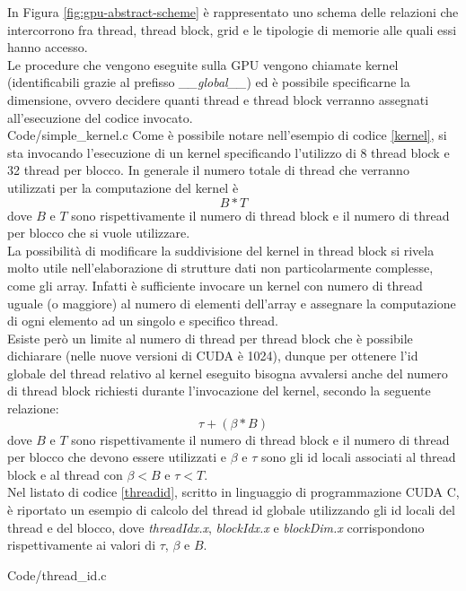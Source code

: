 In Figura \ref{fig:gpu-abstract-scheme} è rappresentato uno schema delle
relazioni che intercorrono fra thread, thread block, grid e le
tipologie di memorie alle quali essi hanno accesso.
\\
Le procedure che vengono eseguite sulla GPU vengono chiamate kernel
(identificabili grazie al prefisso \textit{\_\_global\_\_})
ed è possibile specificarne la dimensione, ovvero decidere quanti
thread e thread block verranno assegnati
all'esecuzione del codice invocato.
\\

    {Code/simple_kernel.c}
Come è possibile notare nell'esempio di codice \ref{kernel}, si sta invocando
l'esecuzione di un kernel specificando l'utilizzo di 8 thread block e
32 thread per blocco. In generale il numero totale di
thread che verranno utilizzati per la computazione del kernel è
$$B * T$$ dove $B$ e $T$
sono rispettivamente
il numero di thread block e il numero
di thread per blocco che si vuole utilizzare.
\\
La possibilità di modificare la suddivisione del kernel in thread block
si rivela molto utile nell'elaborazione di strutture dati non
particolarmente complesse, come gli array.
Infatti è sufficiente invocare un kernel con numero di thread
uguale (o maggiore) al numero di elementi dell'array e assegnare la
computazione di ogni elemento ad un singolo e specifico thread.
\\
Esiste però un limite al numero di thread per thread block che è possibile
dichiarare (nelle nuove versioni di CUDA è 1024), dunque per ottenere
l'id globale del thread relativo al kernel eseguito bisogna avvalersi anche
del numero di thread block richiesti durante l'invocazione del kernel,
secondo la seguente relazione:
$$\tau + (\beta * B)$$
dove $B$ e $T$ sono rispettivamente il numero di thread block
e il numero di thread per blocco che
devono essere utilizzati e $\beta$ e $\tau$ sono gli id locali
associati al thread block e
al thread con $\beta < B$ e $\tau < T$.
\\
Nel listato di codice \ref{threadid}, scritto in linguaggio di programmazione
CUDA C, è riportato un esempio di calcolo del
thread id globale utilizzando gli id locali del thread e del blocco, dove
\textit{threadIdx.x}, \textit{blockIdx.x} e \textit{blockDim.x} corrispondono
rispettivamente ai valori di $\tau$, $\beta$ e $B$.


    {Code/thread_id.c}

